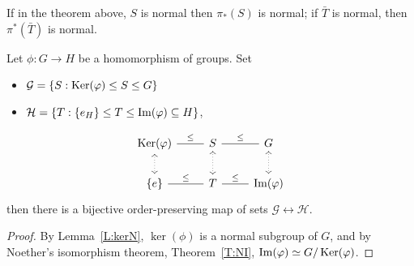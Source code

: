 \documentclass{ximera}
\begin{document}
\begin{corollary}
  If in the theorem above, $S$ is normal then $\pi_*(S)$ is normal; if
  $\bar{T}$ is normal, then $\pi^*(\bar{T})$ is normal.
\end{corollary}


\begin{corollary}
  Let $\phi:G\to H$ be a homomorphism of groups. Set
  \begin{itemize}
  \item $\mathcal{G} = \{S:\mathop{\mathrm{Ker}}\nolimits(\varphi)\leq S\leq G\}$
  \item $\mathcal{H} = \{T:\{e_H\}\leq T\leq \operatorname{Im}(\varphi)\subseteq H\}$,
  \end{itemize}
  \[
  \begin{tikzcd}
    \ker(\phi) \ar[r,-,"\subgp"] \ar[d,<->,dotted]& S\ar[r,-,"\subgp"] \ar[d,<->,dotted]& G \ar[d,<->,dotted]\\
    \{e\} \ar[r,-,"\subgp"] & T \ar[r,-,"\subgp"] & \im(\phi)
  \end{tikzcd}
  \]
  then there is a bijective order-preserving map of sets
  $\mathcal{G}\leftrightarrow\mathcal{H}$.
  \begin{proof}
    By Lemma~\ref{L:kerN}, $\ker(\phi)$ is a normal subgroup of $G$,
    and by Noether's isomorphism theorem, Theorem~\ref{T:NI},
    $\operatorname{Im}(\varphi)\simeq G/\mathop{\mathrm{Ker}}\nolimits(\varphi)$.
  \end{proof}
\end{corollary}
\end{document}

